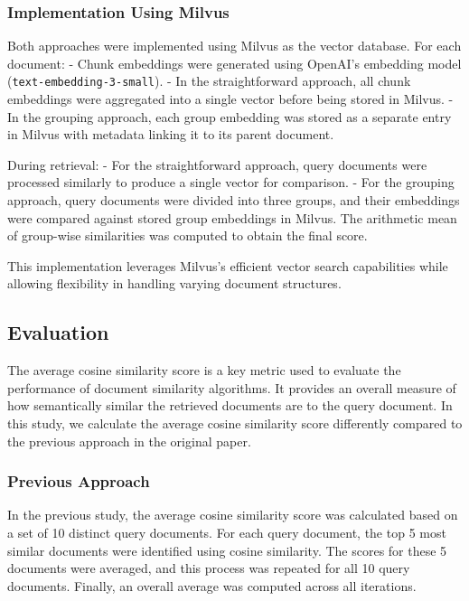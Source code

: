 \documentclass[12pt]{article}
\begin{document}
\subsubsection{Implementation Using Milvus}

Both approaches were implemented using Milvus as the vector database. For each document:
- Chunk embeddings were generated using OpenAI’s embedding model (\texttt{text-embedding-3-small}).
- In the straightforward approach, all chunk embeddings were aggregated into a single vector before being stored in Milvus.
- In the grouping approach, each group embedding was stored as a separate entry in Milvus with metadata linking it to its parent document.

During retrieval:
- For the straightforward approach, query documents were processed similarly to produce a single vector for comparison.
- For the grouping approach, query documents were divided into three groups, and their embeddings were compared against stored group embeddings in Milvus. The arithmetic mean of group-wise similarities was computed to obtain the final score.

This implementation leverages Milvus's efficient vector search capabilities while allowing flexibility in handling varying document structures.

\subsection{Evaluation}

The average cosine similarity score is a key metric used to evaluate the performance of document similarity algorithms. It provides an overall measure of how semantically similar the retrieved documents are to the query document. In this study, we calculate the average cosine similarity score differently compared to the previous approach in the original paper.

\subsubsection{Previous Approach}

In the previous study, the average cosine similarity score was calculated based on a set of 10 distinct query documents. For each query document, the top 5 most similar documents were identified using cosine similarity. The scores for these 5 documents were averaged, and this process was repeated for all 10 query documents. Finally, an overall average was computed across all iterations.
\end{document}
